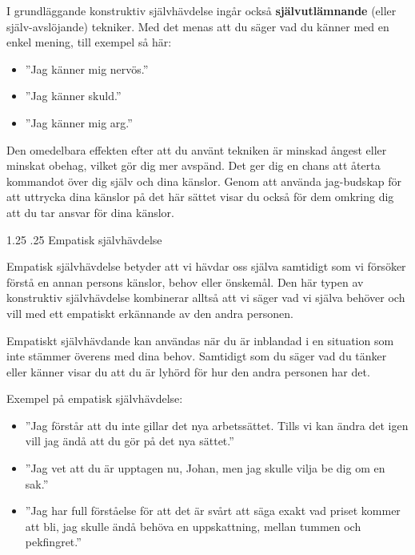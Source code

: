 \documentclass[swedish,a4paper]{book}
\makeatletter
\renewcommand\section{\@startsection{section}{1}{\z@}%
                                   {1.25\baselineskip}%
                                   {.25\baselineskip}%
                                   {\fontsize{1.25\baselineskip}{1.25\baselineskip}\selectfont\sffamily\bfseries}} %
\makeatother
\begin{document}
I grundläggande konstruktiv självhävdelse ingår också \textbf{självutlämnande} (eller själv-avslöjande) tekniker. Med det menas att du säger vad du känner med en enkel mening, till exempel så här:

\begin{itemize}

\item ''Jag känner mig nervös.''

\item ''Jag känner skuld.''

\item ''Jag känner mig arg.''

\end{itemize}

Den omedelbara effekten efter att du använt tekniken är minskad ångest eller minskat obehag, vilket gör dig mer avspänd. Det ger dig en chans att återta kommandot över dig själv och dina känslor. Genom att använda jag-budskap för att uttrycka dina känslor på det här sättet visar du också för dem omkring dig att du tar ansvar för dina känslor.

\section{Empatisk självhävdelse}

Empatisk självhävdelse betyder att vi hävdar oss själva samtidigt som vi försöker förstå en annan persons känslor, behov eller önskemål. Den här typen av konstruktiv självhävdelse kombinerar alltså att vi säger vad vi själva behöver och vill med ett empatiskt erkännande av den andra personen.

Empatiskt självhävdande kan användas när du är inblandad i en situation som inte stämmer överens med dina behov. Samtidigt som du säger vad du tänker eller känner visar du att du är lyhörd för hur den andra personen har det.

Exempel på empatisk självhävdelse:

\begin{itemize}

\item ''Jag förstår att du inte gillar det nya arbetssättet. Tills vi kan ändra det igen vill jag ändå att du gör på det nya sättet.''

\item ''Jag vet att du är upptagen nu, Johan, men jag skulle vilja be dig om en sak.''

\item ''Jag har full förståelse för att det är svårt att säga exakt vad priset kommer att bli, jag skulle ändå behöva en uppskattning, mellan tummen och pekfingret.''

\end{itemize}
\end{document}
